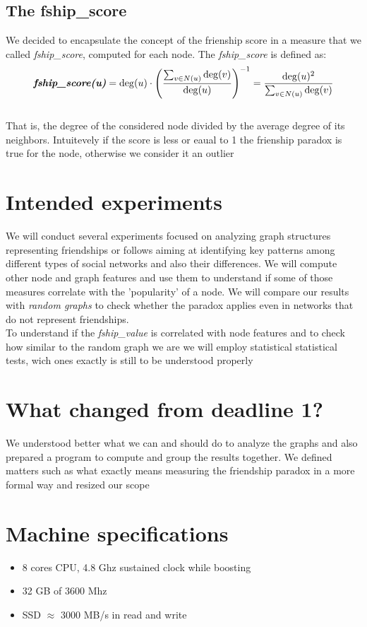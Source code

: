 \documentclass{article}
\begin{document}
\subsection{The fship\_score}
We decided to encapsulate the concept of the frienship score in a measure that we called \textit{fship\_score}, computed for each node. 
The \textit{fship\_score} is defined as:
\\\[
\textit{\textbf{fship\_score(u)}} = \deg(u) \cdot \left( \frac{\sum_{v \in N(u)} \deg(v)}{\deg(u)} \right)^{-1} =
\frac{\deg(u)^{2}}{\sum_{v \in N(u)} \deg(v)}
\]\\
That is, the degree of the considered node divided by the average degree of its neighbors. Intuitevely if the score is less or eaual to 1 the frienship paradox is true for the node, otherwise we consider it an outlier


\section{Intended experiments}
We will conduct several experiments focused on analyzing graph structures representing friendships or follows aiming at identifying key patterns among different types of social networks and also their differences.
We will compute other node and graph features and use them to understand if some of those measures correlate with the 'popularity' of a node.
We will compare our results with \textit{random graphs} to check whether the paradox applies even in networks that do not represent friendships. \\
To understand if the \textit{fship\_value} is correlated with node features and to check how similar to the random graph we are we will employ statistical statistical tests, wich ones exactly is still to be understood properly

\section{What changed from deadline 1?}
We understood better what we can and should do to analyze the graphs and also prepared a program to compute and group the results 
together. We defined matters such as what exactly means measuring the friendship paradox in a more formal way and resized our scope

\section{Machine specifications}
\begin{itemize}
    \item 8 cores CPU, 4.8 Ghz sustained clock while boosting
    \item 32 GB of 3600 Mhz 
    \item SSD $\approx$ 3000 MB/s in read and write
\end{itemize}
\end{document}
